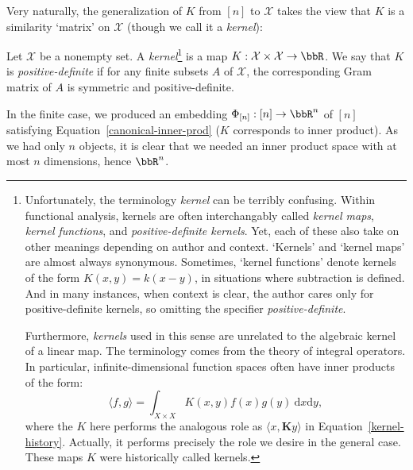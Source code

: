\documentclass[twoside,11pt]{homework}
\begin{document}
\begin{multicols}{2}
Very naturally, the generalization of $K$ from $[n]$ to $\mathcal{X}$ takes the view that $K$ is a similarity `matrix' on $\mathcal{X}$ (though we call it a \emph{kernel}):
\begin{definition} Let $\mathcal{X}$ be a nonempty set. A \emph{kernel}\footnote{Unfortunately, the terminology \emph{kernel} can be terribly confusing. Within functional analysis, kernels are often interchangably called \emph{kernel maps}, \emph{kernel functions}, and \emph{positive-definite kernels}. Yet, each of these also take on other meanings depending on author and context. `Kernels' and `kernel maps' are almost always synonymous. Sometimes, `kernel functions' denote kernels of the form $K(x,y) = k(x-y)$, in situations where subtraction is defined. And in many instances, when context is clear, the author cares only for positive-definite kernels, so omitting the specifier \emph{positive-definite}.

    Furthermore, \emph{kernels} used in this sense are unrelated to the algebraic kernel of a linear map. The terminology comes from the theory of integral operators. In particular, infinite-dimensional function spaces often have inner products of the form:
    \[\langle f, g\rangle = \int_{X \times X} K(x,y) f(x) g(y) \ \mathrm{d}x \mathrm{d}y,\]
    where the $K$ here performs the analogous role as $\langle x, \mathbf{K}y\rangle$ in Equation~\ref{kernel-history}. Actually, it performs precisely the role we desire in the general case. These maps $K$ were historically called kernels.
  } is a map $K : \mathcal{X} \times \mathcal{X} \to \bbR$. We say that $K$ is \emph{positive-definite} if for any finite subsets $A$ of $\mathcal{X}$, the corresponding Gram matrix of $A$ is symmetric and positive-definite.
\end{definition}

In the finite case, we produced an embedding $\Phi_{[n]} : [n] \to \bbR^n$ of $[n]$ satisfying Equation~\ref{canonical-inner-prod} ($K$ corresponds to inner product). As we had only $n$ objects, it is clear that we needed an inner product space with at most $n$ dimensions, hence $\bbR^n$.


\end{multicols}
\end{document}
